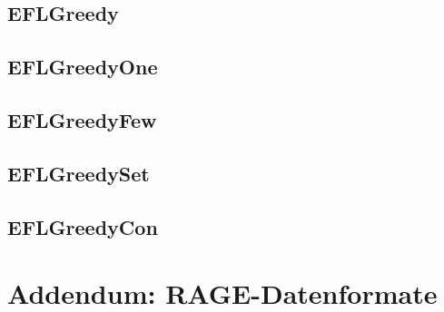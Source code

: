 \documentclass{article}
\begin{document}
	\subsection{EFLGreedy}
	\subsection{EFLGreedyOne}
	\subsection{EFLGreedyFew}
	\subsection{EFLGreedySet}
	\subsection{EFLGreedyCon}
	
	\section{Addendum: RAGE-Datenformate}
	
\end{document}
